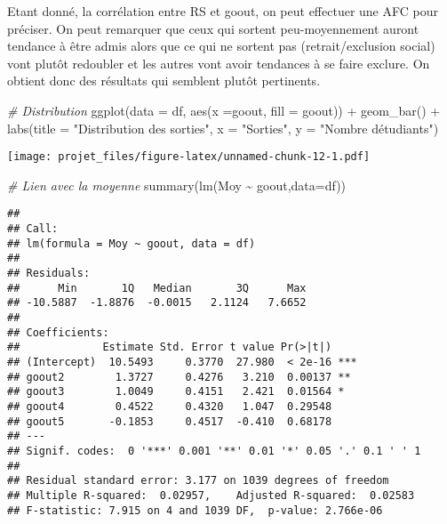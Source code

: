 \documentclass[
]{article}
\newenvironment{Shaded}{\begin{snugshade}}{\end{snugshade}}
\newcommand{\AttributeTok}[1]{\textcolor[rgb]{0.77,0.63,0.00}{#1}}
\newcommand{\CommentTok}[1]{\textcolor[rgb]{0.56,0.35,0.01}{\textit{#1}}}
\newcommand{\FunctionTok}[1]{\textcolor[rgb]{0.00,0.00,0.00}{#1}}
\newcommand{\NormalTok}[1]{#1}
\newcommand{\SpecialCharTok}[1]{\textcolor[rgb]{0.00,0.00,0.00}{#1}}
\newcommand{\StringTok}[1]{\textcolor[rgb]{0.31,0.60,0.02}{#1}}
\begin{document}
Etant donné, la corrélation entre RS et goout, on peut effectuer une AFC
pour préciser. On peut remarquer que ceux qui sortent peu-moyennement
auront tendance à être admis alors que ce qui ne sortent pas
(retrait/exclusion social) vont plutôt redoubler et les autres vont
avoir tendances à se faire exclure. On obtient donc des résultats qui
semblent plutôt pertinents.

\begin{Shaded}
\begin{Highlighting}[]
\CommentTok{\# Distribution}
\FunctionTok{ggplot}\NormalTok{(}\AttributeTok{data =}\NormalTok{ df, }\FunctionTok{aes}\NormalTok{(}\AttributeTok{x =}\NormalTok{goout, }\AttributeTok{fill =}\NormalTok{ goout)) }\SpecialCharTok{+}
  \FunctionTok{geom\_bar}\NormalTok{() }\SpecialCharTok{+}
  \FunctionTok{labs}\NormalTok{(}\AttributeTok{title =} \StringTok{"Distribution des sorties"}\NormalTok{,}
       \AttributeTok{x =} \StringTok{"Sorties"}\NormalTok{, }\AttributeTok{y =} \StringTok{"Nombre d\textquotesingle{}étudiants"}\NormalTok{) }
\end{Highlighting}
\end{Shaded}

\texttt{[image: projet\_files/figure-latex/unnamed-chunk-12-1.pdf]}

\begin{Shaded}
\begin{Highlighting}[]
\CommentTok{\# Lien avec la moyenne}
\FunctionTok{summary}\NormalTok{(}\FunctionTok{lm}\NormalTok{(Moy }\SpecialCharTok{\textasciitilde{}}\NormalTok{ goout,}\AttributeTok{data=}\NormalTok{df))}
\end{Highlighting}
\end{Shaded}

\begin{verbatim}
## 
## Call:
## lm(formula = Moy ~ goout, data = df)
## 
## Residuals:
##      Min       1Q   Median       3Q      Max 
## -10.5887  -1.8876  -0.0015   2.1124   7.6652 
## 
## Coefficients:
##             Estimate Std. Error t value Pr(>|t|)    
## (Intercept)  10.5493     0.3770  27.980  < 2e-16 ***
## goout2        1.3727     0.4276   3.210  0.00137 ** 
## goout3        1.0049     0.4151   2.421  0.01564 *  
## goout4        0.4522     0.4320   1.047  0.29548    
## goout5       -0.1853     0.4517  -0.410  0.68178    
## ---
## Signif. codes:  0 '***' 0.001 '**' 0.01 '*' 0.05 '.' 0.1 ' ' 1
## 
## Residual standard error: 3.177 on 1039 degrees of freedom
## Multiple R-squared:  0.02957,    Adjusted R-squared:  0.02583 
## F-statistic: 7.915 on 4 and 1039 DF,  p-value: 2.766e-06
\end{verbatim}
\end{document}
